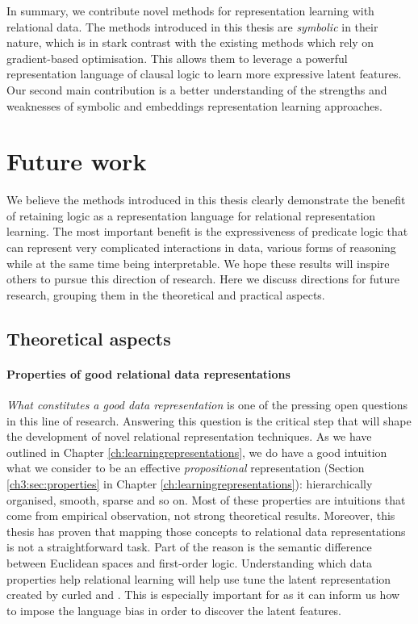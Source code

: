 In summary, we contribute novel methods for representation learning with relational data.
The methods introduced in this thesis are \textit{symbolic} in their nature, which is in stark contrast with the existing methods which rely on gradient-based optimisation.
This allows them to leverage a powerful representation language of clausal logic to learn more expressive latent features.
Our second main contribution is a better understanding of the strengths and weaknesses of symbolic and embeddings representation learning approaches.








\section{Future work}

We believe the methods introduced in this thesis clearly demonstrate the benefit of retaining logic as a representation language for relational representation learning.
The most important benefit is the expressiveness of predicate logic that can represent very complicated interactions in data, various forms of reasoning while at the same time being interpretable.
We hope these results will inspire others to pursue this direction of research.
Here we discuss directions for future research, grouping them in the theoretical and practical aspects.


\subsection{Theoretical aspects}


\paragraph{Properties of good relational data representations}
\textit{What constitutes a good data representation} is one of the pressing open  questions in this line of research.
Answering this question is the critical step that will shape the development of novel relational representation techniques.
As we have outlined in Chapter \ref{ch:learningrepresentations}, we do have a good intuition what we consider to be an effective \textit{propositional} representation (Section \ref{ch3:sec:properties} in Chapter \ref{ch:learningrepresentations}): hierarchically organised, smooth, sparse and so on.
Most of these properties are intuitions that come from empirical observation, not strong theoretical results.
Moreover, this thesis has proven that mapping those concepts to relational data representations is not a straightforward task.
Part of the reason is the semantic difference between Euclidean spaces and first-order logic.
Understanding which data properties help relational learning will help use tune the latent representation created by \gls{curled} and .
This is especially important for  as it can inform us how to impose the language bias in order to discover the latent features.





